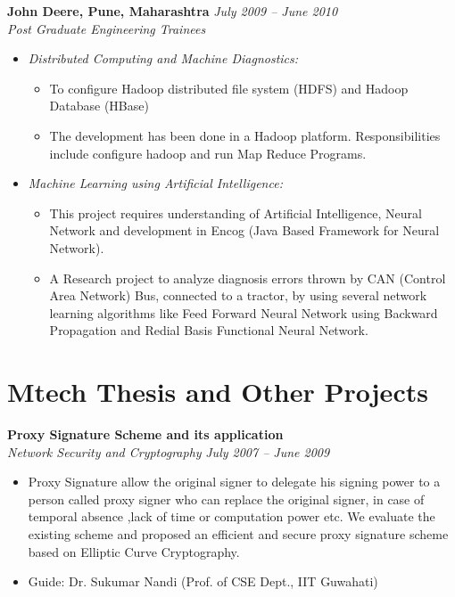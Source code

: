 \documentclass[margin,line]{resume}
\begin{document}
\begin{resume}
    \textbf{John Deere, Pune, Maharashtra }\hfill \textsl{July 2009 -- June 2010}\vspace{0mm}\\\vspace{0mm}%
    \textsl{Post Graduate Engineering Trainees} 
     \begin{itemize}
     \item \textsl{Distributed Computing and Machine Diagnostics:} 
            \begin{itemize}
             \item To configure Hadoop distributed file system (HDFS) and Hadoop Database (HBase)
             \item The development has been done in a Hadoop platform. Responsibilities include configure hadoop and run Map Reduce Programs.
             \end{itemize}
     \item \textsl{Machine Learning using Artificial Intelligence:}
             \begin{itemize}
              \item This project requires understanding of Artificial Intelligence, Neural Network and development in Encog (Java Based Framework for Neural Network).
	       \item A Research project to analyze diagnosis errors thrown by CAN (Control Area  Network) Bus,
   connected to a tractor, by using several network learning algorithms like Feed Forward Neural Network using Backward Propagation and Redial Basis Functional Neural Network.
               \end{itemize}
      \end{itemize}
    \section{\mysidestyle Mtech Thesis and Other Projects}

    \textbf{Proxy Signature Scheme and its application}\vspace{0mm}\\\vspace{0mm}%
    \textsl{Network Security and Cryptography}  \hfill \textsl{July 2007 -- June 2009}
       \begin{itemize}
	\item Proxy Signature allow the original signer to delegate his signing power to a person 
         called proxy signer  who can replace the original signer, in case of temporal absence ,lack of time or computation power etc.
        We evaluate the existing scheme and proposed an efficient and secure proxy signature scheme based on Elliptic Curve 
        Cryptography. 
	\item Guide: Dr. Sukumar Nandi (Prof. of CSE Dept., IIT Guwahati)
       \end{itemize}
       

\end{resume}
\end{document}
